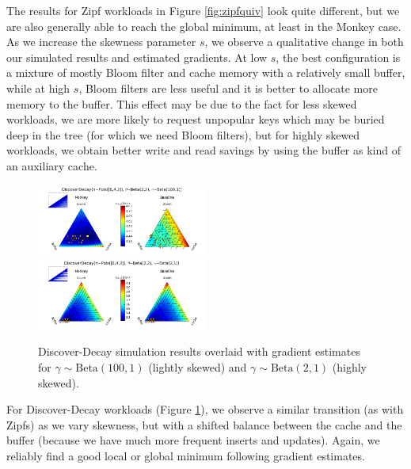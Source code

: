 \documentclass{sig-alternate-05-2015}
\begin{document}
The results for Zipf workloads in Figure \ref{fig:zipfquiv} look quite
different, but we are also generally able to reach the global minimum, at least
in the Monkey case. As we increase the skewness parameter $s$, we observe a
qualitative change in both our simulated results and estimated gradients. At
low $s$, the best configuration is a mixture of mostly Bloom filter and cache
memory with a relatively small buffer, while at high $s$, Bloom filters are
less useful and it is better to allocate more memory to the buffer. This effect
may be due to the fact for less skewed workloads, we are more likely to request
unpopular keys which may be buried deep in the tree (for which we need Bloom
filters), but for highly skewed workloads, we obtain better write and read
savings by using the buffer as kind of an auxiliary cache.

\begin{figure}[!htb]
\begin{center}
\includegraphics[width=0.5\textwidth]{discdecquiv2.png}
\includegraphics[width=0.5\textwidth]{discdecquiv1.png}
\end{center}
\caption{Discover-Decay simulation results overlaid with gradient estimates for
$\gamma\sim\text{Beta}(100,1)$ (lightly skewed) and
$\gamma\sim\text{Beta}(2,1)$ (highly skewed).}
\label{fig:discdecquiv}
\end{figure}

For Discover-Decay workloads (Figure \ref{fig:discdecquiv}), we observe a
similar transition (as with Zipfs) as we vary skewness, but with a shifted
balance between the cache and the buffer (because we have much more frequent
inserts and updates). Again, we reliably find a good local or global minimum
following gradient estimates.
\end{document}
